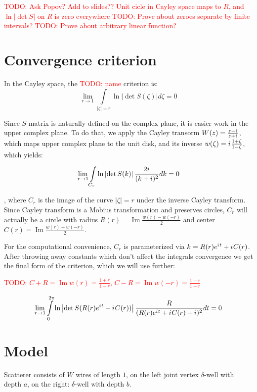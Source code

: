 \documentclass[12pt, a4paper]{article}
\newcommand{\abs}[1]{\left| #1 \right|}
\newcommand{\eexp}[1]{e^{#1}}
\newcommand{\iu}{{i\mkern1mu}}
\renewcommand{\Im}{\operatorname{Im}}
\newcommand{\todo}[1]{{\large \textcolor{red}{TODO: #1}}}
\begin{document}
\todo{Ask Popov? Add to slides?? Unit cicle in Cayley space maps to $R$, and $\ln\abs{\det S}$ on $R$ is zero everywhere}
\todo{Prove about zeroes separate by finite intervals?}
\todo{Prove about arbitrary linear function?}


\section{Convergence criterion}

In the Cayley space, the \todo{name} criterion is:
\[
\lim\limits_{r \to 1} \int\limits_{\abs{\zeta} = r} \ln \abs{\det S(\zeta)} d\zeta = 0
\]

Since $S$-matrix is naturally defined on the complex plane, it is easier work in the upper complex plane. To do that, we apply the Cayley transorm $W(z) = \frac{z - \iu}{z + \iu}$, which maps upper complex plane to the unit disk, and its inverse $w(\zeta) = \iu \frac{1 + \zeta}{1 - \zeta}$, which yields:

\begin{equation}\label{crit}
\lim\limits_{r \to 1} \int\limits_{C_r} \ln \abs{\det S(k)} \frac{2 \iu}{(k + i)^2} dk = 0
\end{equation}

, where $C_r$ is the image of the curve $\abs{\zeta} = r$ under the inverse Cayley transform. Since Cayley transform is a Mobius transformation and preserves circles, $C_r$ will actually be a circle with radius $R(r) = \Im \frac{w(r) - w(-r)}{2}$ and center $C(r) = \Im \frac{w(r) + w(-r)}{2}$.

For the computational convenience, $C_r$ is parameterized via $k = R(r) \eexp{\iu t} + \iu C(r)$. After throwing away constants which don't affect the integrals convergence we get the final form of the criterion, which we will use further:

\todo{$C + R = \Im w(r) = \frac{1 + r}{1 - r}$, $C - R = \Im w(-r) = \frac{1 - r}{1 + r}$}

\begin{equation}\label{critp}
\lim\limits_{r \to 1} \int\limits_{0}^{2 \pi} \ln \abs{\det S(R(r) \eexp{\iu t} + \iu C(r))} \frac{R}{(R(r) \eexp{\iu t} + \iu C(r) + i)^2} dt = 0
\end{equation}

\section{Model}

Scatterer consists of $W$ wires of length $1$, on the left joint vertex $\delta$-well with depth $a$, on the right: $\delta$-well with depth $b$. 
\end{document}
